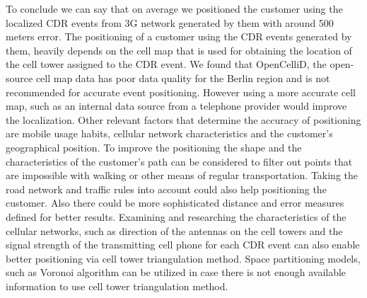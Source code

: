 To conclude we can say that on average we positioned the customer using the localized CDR events from 3G network generated by them with around 500 meters error.
The positioning of a customer using the CDR events generated by them, heavily depends on the cell map that is used for obtaining the location of the cell tower assigned to the CDR event. 
We found that OpenCelliD, the open-source cell map data has poor data quality for the Berlin region and is not recommended for accurate event positioning. 
However using a more accurate cell map, such as an internal data source from a telephone provider would improve the localization.
Other relevant factors that determine the accuracy of positioning are mobile usage habits, cellular network characteristics and the customer's geographical position.
To improve the positioning the shape and the characteristics of the customer's path can be considered to filter out points that are impossible with walking or other means of regular transportation. Taking the road network and traffic rules into account could also help positioning the customer. Also there could be more sophisticated distance and error measures defined for better results.
Examining and researching the characteristics of the cellular networks, such as direction of the antennas on the cell towers and the signal strength of the transmitting cell phone for each CDR event can also enable better positioning via cell tower triangulation method. Space partitioning models, such as Voronoi algorithm can be utilized in case there is not enough available information to use cell tower triangulation method.

